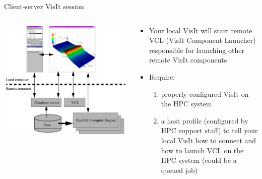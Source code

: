 \begin{frame}{Client-server VisIt session}
  \vspace{-5mm}
  \begin{columns}
    \begin{column}{7.25cm}
      \includegraphics[width=\columnwidth]{figs/visit-guis/VisIt_arch}
    \end{column}
    \begin{column}{5.00cm}
      \begin{itemize}\setlength{\itemsep}{3mm}
      \item{\footnotesize Your local VisIt will start remote VCL (VisIt Component Launcher) responsible
        for launching other remote VisIt components}
      \item{\footnotesize Require:}
        \begin{enumerate}\setlength{\itemsep}{0mm}
        \item{\scriptsize properly configured VisIt on the HPC system}
        \item{\scriptsize a host profile (configured by HPC support staff) to tell your local VisIt
          how to connect and how to launch VCL on the HPC system (could be a queued job)}
        \end{enumerate}
      \end{itemize}
    \end{column}
  \end{columns}
\end{frame}

